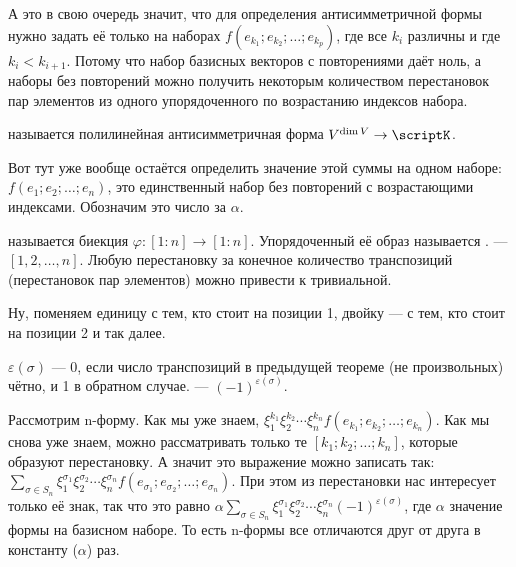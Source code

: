 \documentclass{article}
\begin{document}
\begin{itemize}
\begin{Comment}
            А это в свою очередь значит, что для определения антисимметричной формы нужно задать её только на наборах $f(e_{k_1};e_{k_2};\ldots;e_{k_p})$, где все $k_i$ различны и где $k_i<k_{i+1}$. Потому что набор базисных векторов с повторениями даёт ноль, а наборы без повторений можно получить некоторым количеством перестановок пар элементов из одного упорядоченного по возрастанию индексов набора.
        \end{Comment}
        \dfn {} называется полилинейная антисимметричная форма $V^{\dim V}\to\scriptK$.
        \begin{Comment}
            Вот тут уже вообще остаётся определить значение этой суммы на одном наборе: $f(e_1;e_2;\ldots;e_n)$, это единственный набор без повторений с возрастающими индексами. Обозначим это число за $\alpha$.
        \end{Comment}
        \dfn {} называется биекция $\varphi\colon[1:n]\to[1:n]$. Упорядоченный её образ называется .
        \dfn {} --- $[1,2,\ldots,n]$.
        \thm Любую перестановку за конечное количество транспозиций (перестановок пар элементов) можно привести к тривиальной.
        \begin{Proof}
            Ну, поменяем единицу с тем, кто стоит на позиции 1, двойку --- с тем, кто стоит на позиции 2 и так далее.
        \end{Proof}
        \dfn {} $\varepsilon(\sigma)$ --- 0, если число транспозиций в предыдущей теореме (не произвольных) чётно, и 1 в обратном случае.  --- $(-1)^{\varepsilon(\sigma)}$.
        \begin{Comment}
            Рассмотрим n-форму. Как мы уже знаем, $\xi_1^{k_1}\xi_2^{k_2}\cdots\xi_n^{k_n}f(e_{k_1};e_{k_2};\ldots;e_{k_n})$. Как мы снова уже знаем, можно рассматривать только те $[k_1;k_2;\ldots;k_n]$, которые образуют перестановку. А значит это выражение можно записать так: $\sum\limits_{\sigma\in S_n}\xi_1^{\sigma_1}\xi_2^{\sigma_2}\cdots\xi_n^{\sigma_n}f(e_{\sigma_1};e_{\sigma_2};\ldots;e_{\sigma_n})$. При этом из перестановки нас интересует только её знак, так что это равно $\alpha\sum\limits_{\sigma\in S_n}\xi_1^{\sigma_1}\xi_2^{\sigma_2}\cdots\xi_n^{\sigma_n}(-1)^{\varepsilon(\sigma)}$, где $\alpha$ значение формы на базисном наборе. То есть n-формы все отличаются друг от друга в константу ($\alpha$) раз.
        \end{Comment}

\end{itemize}
\end{document}
